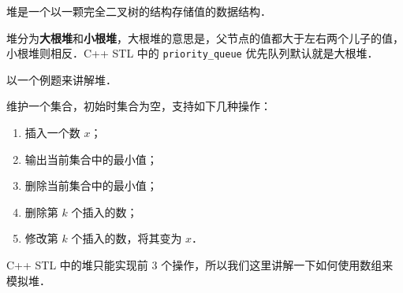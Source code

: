 
堆是一个以一颗完全二叉树的结构存储值的数据结构．

堆分为\textbf{大根堆}和\textbf{小根堆}，大根堆的意思是，父节点的值都大于左右两个儿子的值，小根堆则相反．C++ STL 中的 \verb|priority_queue| 优先队列默认就是大根堆．

以一个例题来讲解堆．

维护一个集合，初始时集合为空，支持如下几种操作：
\begin{enumerate}
\item 插入一个数 $x$；
\item 输出当前集合中的最小值；
\item 删除当前集合中的最小值；
\item 删除第 $k$ 个插入的数；
\item 修改第 $k$ 个插入的数，将其变为 $x$．
\end{enumerate}

C++ STL 中的堆只能实现前 $3$ 个操作，所以我们这里讲解一下如何使用数组来模拟堆．